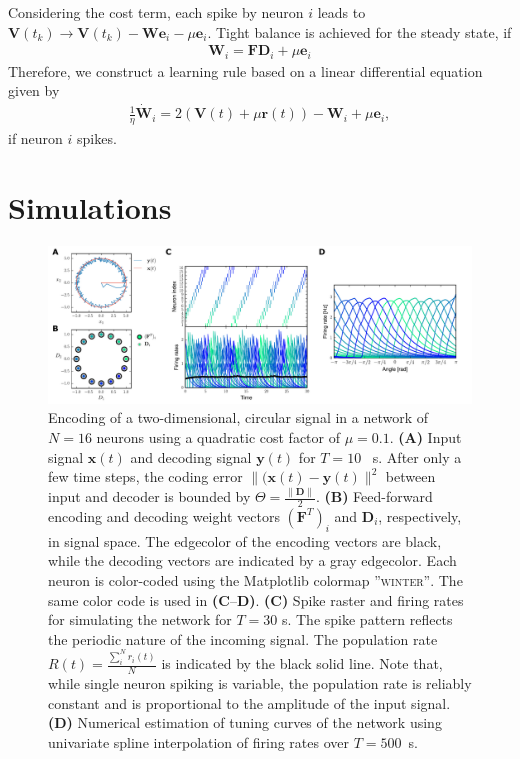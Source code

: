 \documentclass[twoside,twocolumn]{article}
\renewcommand{\b}[1]{\textbf{#1}}
\begin{document}
Considering the cost term, each spike by neuron $i$ leads to $\b{V}(t_k) \rightarrow \b{V}(t_k) - \b{W}\b{e}_i  - \mu \b{e}_i$. Tight balance is achieved for the steady state, if
\begin{align}
\b{W}_i = \b{F}\b{D}_i +\mu \b{e}_i
\label{eqn:learn}
\end{align}
Therefore, we construct a learning rule based on a linear differential equation given by
  \begin{align}
 \frac{1}{\eta} \dot{\b{W}}_i = 2(\b{V}(t)+\mu \b{r}(t)) - \b{W}_i + \mu \b{e}_i,
 \label{eqn:learncost}
 \end{align}
 if neuron $i$ spikes.

\section{Simulations}
\label{sec:results}

\begin{figure}[!ht]
  \includegraphics[width=\textwidth]{../plots/Fig2.pdf}
  \caption{Encoding of a two-dimensional, circular signal in a network of $N=16$ neurons using a quadratic cost factor of $\mu=0.1$. \textbf{(A)} Input signal $\b{x}(t)$ and decoding signal $\b{y}(t)$ for $T=10$ ~s. After only a few time steps, the coding error $\|(\b{x}(t)-\b{y}(t) \|^2$ between input and decoder is bounded by $\Theta=\frac{\|\b{D}\|}{2}$. \textbf{(B)} Feed-forward encoding and decoding weight vectors $(\b{F}^T)_i$ and $\b{D}_i$, respectively, in signal space. The edgecolor of the encoding vectors are black, while the decoding vectors are indicated by a gray edgecolor. Each neuron is color-coded using the Matplotlib colormap \textsc{''winter''}. The same color code is used in \textbf{(C}--\textbf{D)}.  \textbf{(C)} Spike raster and firing rates for simulating the network for $T=30$ s. The spike pattern reflects the periodic nature of the incoming signal. The population rate $R(t) = \frac{\sum_i^Nr_i(t)}{N}$ is indicated by the black solid line. Note that, while single neuron spiking is variable, the population rate is reliably constant and is proportional to the amplitude of the input signal. \textbf{(D)} Numerical estimation of tuning curves of the network using univariate spline interpolation of firing rates over $T=500$~s. }
  \label{fig:2Dsys}
\end{figure}
\end{document}
